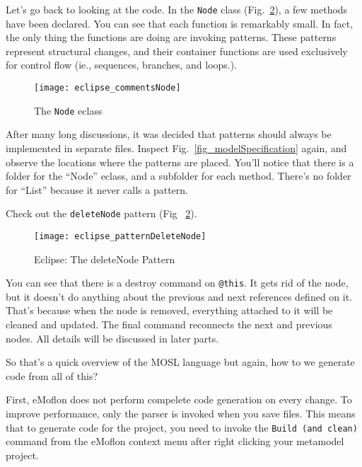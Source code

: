 Let's go back to looking at the code. In the \texttt{Node} class (Fig.~\ref{fig_patternDeleteNode}), a few methods have been declared. You can see that each
function is remarkably small. In fact, the only thing the functions are doing are invoking patterns. These patterns represent structural changes, and their
container functions are used exclusively for control flow (ie., sequences, branches, and loops.).

 \begin{figure}[htbp]
  \centering
  \texttt{[image: eclipse\_commentsNode]}
  \caption{The \texttt{Node} eclass}
  \label{fig_eclassNode}
\end{figure}


After many long discussions, it was decided that patterns should always be implemented in separate files. Inspect Fig.~\ref{fig_modelSpecification} again, and
observe the locations where the patterns are placed. You'll notice that there is a folder for the ``Node'' eclass, and a subfolder for each method. There's no
folder for ``List'' because it never calls a pattern.

Check out the \texttt{deleteNode} pattern (Fig ~\ref{fig_patternDeleteNode}).

 \begin{figure}[htbp]
  \centering
  \texttt{[image: eclipse\_patternDeleteNode]}
  \caption{Eclipse: The deleteNode Pattern}
  \label{fig_patternDeleteNode}
\end{figure}

You can see that there is a destroy command on \texttt{@this}. It gets rid of the node, but it doesn't do anything about the previous and next references
defined on it. That's because when the node is removed, everything attached to it will be cleaned and updated. The final command reconnects the next and
previous nodes. All details will be discussed in later parts.
 
So that's a quick overview of the MOSL language but again, how to we generate code from all of this?


First, eMoflon does not perform compelete code generation on every change. To improve performance, only the parser is invoked when you save files. This means
that to generate code for the project, you need to invoke the \texttt{Build (and clean)} command from the eMoflon context menu after right clicking your
metamodel project.
